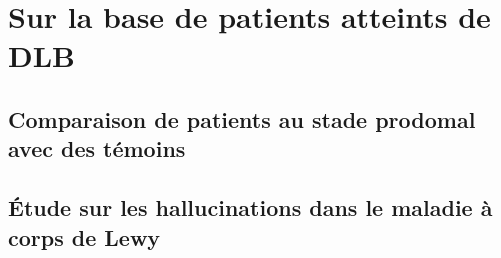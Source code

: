 \section{Sur la base de patients atteints de DLB}
\subsection{Comparaison de patients au stade prodomal avec des témoins}
\subsection{Étude sur les hallucinations dans le maladie à corps de Lewy}


